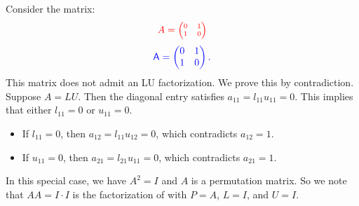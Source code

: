 \documentclass[10pt,twoside]{siamart1116}
\numberwithin{theorem}{section}
\providecommand{\DIFadd}[1]{{\protect\color{blue} \sf #1}} %
\providecommand{\DIFdel}[1]{{\protect\color{red} \scriptsize #1}} %
\providecommand{\DIFaddbegin}{} %
\providecommand{\DIFaddend}{} %
\providecommand{\DIFdelbegin}{} %
\providecommand{\DIFdelend}{} %
\begin{document}
Consider the matrix:
\DIFdelbegin \[
	\DIFdel{A = \begin{pmatrix} 0 & 1 \\ 1 & 0 \end{pmatrix}
}\]%
\DIFdelend \DIFaddbegin \[
  \DIFadd{A =
  \begin{pmatrix} 0 & 1 \\ 1 & 0
  \end{pmatrix} .
}\]\DIFaddend 
This matrix does not admit an LU factorization. We prove this by contradiction. Suppose $A = LU$. Then the diagonal entry satisfies $a_{11} = l_{11} u_{11} = 0$. This implies that either $l_{11} = 0$ or $u_{11} = 0$.
\begin{itemize}
  \item If $l_{11} = 0$, then $a_{12} = l_{11} u_{12} = 0$, which contradicts $a_{12} = 1$.
  \item If $u_{11} = 0$, then $a_{21} = l_{21} u_{11} = 0$, which contradicts $a_{21} = 1$.
\end{itemize}

In this special case, we have $A^2 = I$ and $A$ is a permutation matrix. So we note that $A A = I \cdot I$ is the factorization of  with $P = A$, $L = I$, and $U = I$.
\end{document}
